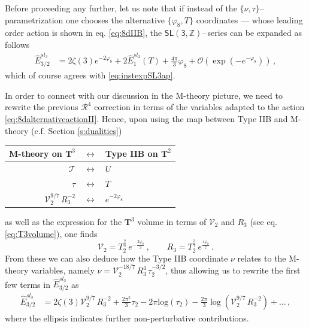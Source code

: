 Before proceeding any further, let us note that if instead of the $\lbrace \nu, \tau\rbrace$--\,parametrization one chooses the alternative $\lbrace \varphi_8, T\rbrace$ coordinates --- whose leading order action is shown in eq. \eqref{eq:8dIIB}, the $\mathsf{SL(3,\mathbb{Z})}$--\,series can be expanded as follows
%
\begin{align}\label{eq:Eisenstein3/2-2ap}
	\hat{E}_{3/2}^{sl_3} &= 2\zeta(3) e^{-2\varphi_8} + 2 \hat{E}_{1}^{sl_2} (T) + \frac{4 \pi}{3} \varphi_8 + \mathcal{O} \left( \exp(-e^{-\varphi_8})\right)\, ,
\end{align}
%
which of course agrees with \eqref{eq:instexpSL3ap}.

In order to connect with our discussion in the M-theory picture, we need to rewrite the previous $\mathcal{R}^4$ correction in terms of the variables adapted to the action \eqref{eq:8dalternativeactionII}. Hence, upon using the map between Type IIB and M-theory (c.f. Section \ref{s:dualities})
%
\begin{center}
\renewcommand{\arraystretch}{2.00}
\begin{tabular}{r c l}
M-theory on $\mathbf{T}^3$ & $\longleftrightarrow $ & Type IIB on $\mathbf{T}^2$\\ 
\hline
\hline  
$\mathcal{T}$ & $ \longleftrightarrow$ & $U$ \\
$\tau$ & $\longleftrightarrow $&  $T$\\
$\mathcal{V}_2^{9/7}\, R_3^{-2}$ & $\longleftrightarrow $ & $e^{-2\varphi_8}$
\end{tabular}\label{tab:8dMthy/IIB}
\end{center}  
%
as well as the expression for the $\mathbf{T}^3$ volume in terms of $\mathcal{V}_2$ and $R_3$ (see eq. \eqref{eq:T3volume}), one finds
%
\begin{equation} \label{eq:usefulmap}
      \mathcal{V}_2 = T_2^{\frac{2}{3}}\, e^{-\frac{2\varphi_8}{3}}\, , \qquad R_3 = T_2^{\frac{3}{7}}\, e^{\frac{4\varphi_8}{7}}\, .
\end{equation}
%
From these we can also deduce how the Type IIB coordinate $\nu$ relates to the M-theory variables, namely $\nu=\mathcal{V}_2^{-18/7}\, R_3^4\, \tau_2^{-3/2}$, thus allowing us to rewrite the first few terms in $\hat{E}_{3/2}^{sl_3}$ as
%
\begin{align}\label{eq:instexpSL3Mth1}
	\hat{E}_{3/2}^{sl_3} &= 2\zeta(3) \mathcal{V}_2^{9/7}\, R_3^{-2} + \frac{2\pi^2}{3} \tau_2 - 2\pi \text{log} (\tau_2) - \frac{2 \pi}{3} \log \left( \mathcal{V}_2^{9/7}\, R_3^{-2}\right) + \ldots\, ,
\end{align}
%
where the ellipsis indicates further non-perturbative contributions.


